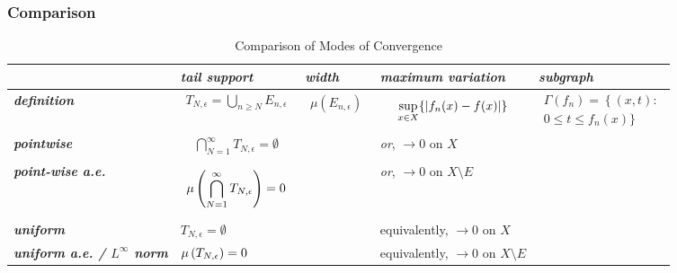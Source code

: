 \documentclass[11pt]{article}
\begin{document}
\newpage
\subsubsection{Comparison}
\begin{table}[h!]
\setlength{\abovedisplayskip}{0pt}
\setlength{\belowdisplayskip}{-10pt}
\setlength{\abovedisplayshortskip}{0pt}
\setlength{\belowdisplayshortskip}{0pt}
\footnotesize
\centering
\caption{Comparison of Modes of Convergence}
\label{tab: convergence}
\renewcommand\tabularxcolumn[1]{m{#1}}
\small
\begin{tabularx}{1\textwidth} { 
  | >{\raggedright\arraybackslash} m{2cm}
  | >{\centering\arraybackslash}X
  | >{\centering\arraybackslash}X
  | >{\centering\arraybackslash}X
  | >{\centering\arraybackslash}X  | }
 \hline
 &    \emph{\textbf{tail support}} & \emph{\textbf{width}} & \emph{\textbf{maximum variation}} & \emph{\textbf{subgraph}}\\
 \hline 
 \emph{\textbf{definition}}& 
 \begin{align*}
 T_{N,\epsilon} =\bigcup_{n \ge N}E_{n,\epsilon}
\end{align*} &  
\begin{align*}
\mu(E_{n,\epsilon})
\end{align*}
& 
\begin{align*}
\sup_{x \in X}\{\left\lvert f_n(x) - f(x) \right\rvert\}
\end{align*}
&
\begin{align*}
\Gamma(f_{n}) =\left\{(x,t): \right.\\
\left. 0\le t \le f_n(x)\}\right.
\end{align*} 
 \\
 \hline
 \emph{\textbf{pointwise}}  & 
  \begin{align*}
 \bigcap_{N=1}^{\infty}T_{N,\epsilon} = \emptyset
\end{align*}
& & \emph{or}, $\rightarrow 0$ on $X$ &   \\
\hline
 \emph{\textbf{point-wise a.e.}}   & 
  \begin{align*}
 \mu\left(\bigcap_{N=1}^{\infty}T_{N,\epsilon}\right) = 0
\end{align*}
& &  \emph{or}, $\rightarrow 0$ on $X \setminus E$ &  \\
\hline
\emph{\textbf{uniform}}  & $T_{N,\epsilon} = \emptyset$ & & 
 equivalently, $\rightarrow 0$ on $X$ & \\
\hline
\emph{\textbf{uniform a.e. / $L^{\infty}$ norm}}  & $\mu\left(T_{N,\epsilon}\right) =0$ & & 
equivalently, $\rightarrow 0$ on $X \setminus E$  & \\

\end{tabularx}
\end{table}
\end{document}
